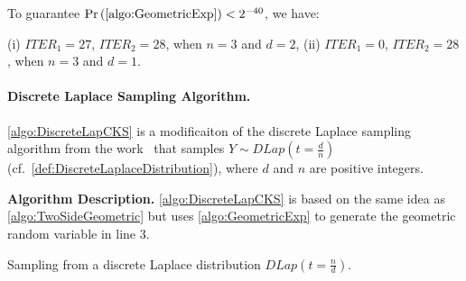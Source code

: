 To guarantee $\Pr\left(\autoref{algo:GeometricExp}\right)<2^{-40}$, we have:

(i) $ITER_1=27$, $ITER_2=28$, when $n=3$ and $d=2$,
(ii) $ITER_1=0$, $ITER_2=28$, when $n=3$ and $d=1$.


\paragraph{Discrete Laplace Sampling Algorithm.}
\label{para:DiscrettLaplaceSamplingAlgorithm}
\autoref{algo:DiscreteLapCKS} is a modificaiton of the discrete Laplace sampling algorithm from the work~\cite{canonne2020discrete} that samples $Y\sim DLap\left( t=\frac{d}{n}\right)$ (cf.~\autoref{def:DiscreteLaplaceDistribution}), where $d$ and $n$ are positive integers.

\textbf{Algorithm Description.}
\autoref{algo:DiscreteLapCKS} is based on the same idea as \autoref{algo:TwoSideGeometric} but uses \autoref{algo:GeometricExp} to generate the geometric random variable in line $3$.

\begin{algorithm}[tbh!]
    \centering
    \caption{Sampling from a discrete Laplace distribution $  DLap\left(t=\frac{n}{d}\right)$.}
    \label{algo:DiscreteLapCKS}
\end{algorithm}
\FloatBarrier

